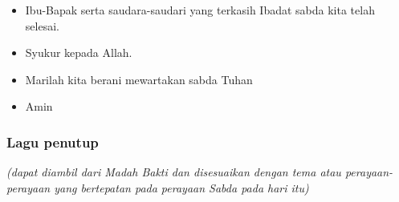 \documentclass[a4paper,12pt]{article}
\newcommand{\BU}[1]{\begin{itemize} \item[U:] #1 \end{itemize}}
\newcommand{\BP}[1]{\begin{itemize} \item[P:] #1 \end{itemize}}
\begin{document}
\BP{Ibu-Bapak serta saudara-saudari yang terkasih Ibadat sabda kita telah selesai.}

\BU{Syukur kepada Allah.}

\BP{Marilah kita berani mewartakan sabda Tuhan}

\BU{Amin}

\subsubsection*{Lagu penutup}

\textit{(dapat diambil dari Madah Bakti dan disesuaikan dengan tema atau perayaan-perayaan yang bertepatan pada perayaan Sabda
pada hari itu)
}
\end{document}
